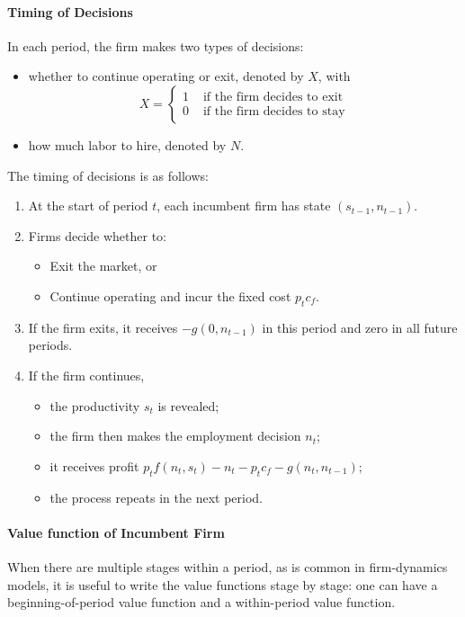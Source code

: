 \documentclass[12pt]{article}
\begin{document}
\paragraph{Timing of Decisions}
In each period, the firm makes two types of decisions:
\begin{itemize}
	\item whether to continue operating or exit, denoted by $X$, with
\[X = \begin{cases}
	1 & \text{ if the firm decides to exit} \\
	0 & \text{ if the firm decides to stay}
\end{cases}\]
	\item how much labor to hire, denoted by $N$.
\end{itemize}
The timing of decisions is as follows:
\begin{enumerate}
		\item At the start of period $t$, each incumbent firm has state $(s_{t-1}, n_{t-1})$.
	\item Firms decide whether to:
	\begin{itemize}
		\item Exit the market, or
		\item Continue operating and incur the fixed cost \( p_t c_f \).
	\end{itemize}
		\item If the firm exits, it receives $-g(0, n_{t-1})$ in this period and zero in all future periods.
		\item If the firm continues,
	\begin{itemize}
		\item the productivity $s_t$ is revealed;
			\item the firm then makes the employment decision $n_t$;
			\item it receives profit $p_t f(n_t, s_t) - n_t - p_t c_f - g(n_t, n_{t-1})$;
			\item the process repeats in the next period.
	\end{itemize}
\end{enumerate}

\paragraph{Value function of Incumbent Firm}
When there are multiple stages within a period, as is common in firm-dynamics models, it is useful to write the value functions stage by stage: one can have a beginning-of-period value function and a within-period value function. 
\end{document}
